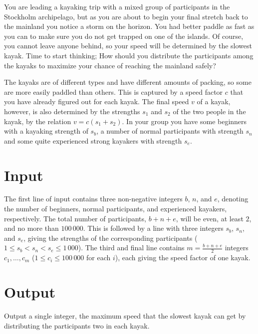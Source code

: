 
%
\noindent
You are leading a kayaking trip with a mixed group of participants in the Stockholm archipelago, but as you are about to begin your final stretch back to the mainland you notice a storm on the horizon. You had better paddle as fast as you can to make sure you do not get trapped on one of the islands. Of course, you cannot leave anyone behind, so your speed will be determined by the slowest kayak. Time to start thinking; How should you distribute the participants among the kayaks to maximize your chance of reaching the mainland safely?

The kayaks are of different types and have different amounts of packing, so some are more easily paddled than others. This is captured by a speed factor $c$ that you have already figured out for each kayak. The final speed $v$ of a kayak, however, is also determined by the strengths $s_1$ and $s_2$ of the two people in the kayak, by the relation $v=c(s_1+s_2)$. In your group you have some beginners with a kayaking strength of $s_b$, a number of normal participants with strength $s_n$ and some quite experienced strong kayakers with strength $s_e$.

\section*{Input}
The first line of input contains three non-negative integers $b$, $n$, and $e$, denoting the number of beginners, normal participants, and experienced kayakers, respectively. The total number of participants, $b+n+e$, will be even, at least $2$, and no more than $100\,000$. This is followed by a line with three integers $s_b$, $s_n$, and $s_e$, giving the strengths of the corresponding participants ($1 \leq s_b < s_n < s_e \leq 1\,000$).
The third and final line contains $m = \frac{b+n+e}{2}$ integers $c_1, \ldots, c_m$ ($1 \leq c_i \leq 100\,000$ for each $i$), each giving the speed factor of one kayak.

\section*{Output}
Output a single integer, the maximum speed that the slowest kayak can get by distributing the participants two in each kayak.
